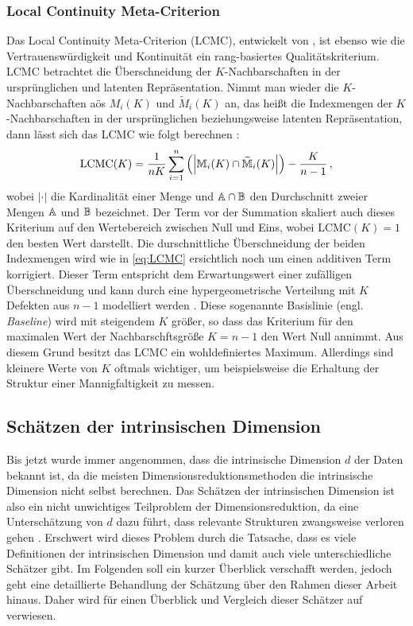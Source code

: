 \subsubsection{Local Continuity Meta-Criterion}
\label{ch:Vergleich:sec:Methodik:subsec:Qualitaetskriterien:LCMC}
Das Local Continuity Meta-Criterion (LCMC), entwickelt von \textcite{Chen.2009}, ist ebenso wie die Vertrauenswürdigkeit und Kontinuität ein rang-basiertes Qualitätskriterium. LCMC betrachtet die Überschneidung der $K$-Nachbarschaften in der ursprünglichen und latenten Repräsentation. Nimmt man wieder die $K$-Nachbarschaften aös $M_i(K)$ und $\widetilde{M}_i(K)$ an, das heißt die Indexmengen der $K$-Nachbarschaften in der ursprünglichen beziehungsweise latenten Repräsentation, dann lässt sich das LCMC wie folgt berechnen \parencite[212]{Chen.2009}:
\begin{equation}
	\label{eq:LCMC}
	\text{LCMC}(K) = \frac{1}{nK} \sum_{i=1}^{n} \left( \left| \mathbb{M}_i(K) \cap \widetilde{\mathbb{M}}_i(K) \right| \right) - \frac{K}{n - 1} \,,
\end{equation}
wobei $­|\cdot|$ die Kardinalität einer Menge und $\mathbb{A} \cap \mathbb{B}$ den Durchschnitt zweier Mengen $\mathbb{A}$ und $\mathbb{B}$ bezeichnet. Der Term vor der Summation skaliert auch dieses Kriterium auf den Wertebereich zwischen Null und Eins, wobei LCMC$(K) = 1$ den besten Wert darstellt. Die durschnittliche Überschneidung der beiden Indexmengen wird wie in \eqref{eq:LCMC} ersichtlich noch um einen additiven Term korrigiert. Dieser Term entspricht dem Erwartungswert einer zufälligen Überschneidung und kann durch eine hypergeometrische Verteilung mit $K$ Defekten aus $n - 1$ modelliert werden \parencite[213]{Chen.2009}. Diese sogenannte Basislinie (engl. \textit{Baseline}) wird mit steigendem
$K$ größer, so dass das Kriterium für den maximalen Wert der Nachbarschftsgröße $K = n - 1$ den
Wert Null annimmt. Aus diesem Grund besitzt das LCMC ein wohldefiniertes Maximum. Allerdings sind
kleinere Werte von $K$ oftmals wichtiger, um beispielsweise die Erhaltung der Struktur einer
Mannigfaltigkeit zu messen.

\subsection{Schätzen der intrinsischen Dimension}
\label{ch:Vergleich:sec:Methodik:subsec:SchaetzenDerIntrinsischenDim}

Bis jetzt wurde immer angenommen, dass die intrinsische Dimension $d$ der Daten bekannt ist, da die
meisten Dimensionsreduktionsmethoden die intrinsische Dimension nicht selbst berechnen. Das
Schätzen der intrinsischen Dimension ist also ein nicht unwichtiges Teilproblem der
Dimensionsreduktion, da eine Unterschätzung von $d$ dazu führt, dass relevante Strukturen
zwangsweise verloren gehen \parencite[1]{Levina.2004}. Erschwert wird dieses Problem durch die Tatsache, dass es viele
Definitionen der intrinsischen Dimension und damit auch viele unterschiedliche Schätzer gibt. Im
Folgenden soll ein kurzer Überblick verschafft werden, jedoch geht eine detaillierte Behandlung der
Schätzung über den Rahmen dieser Arbeit hinaus. Daher wird für einen Überblick und Vergleich dieser
Schätzer auf \textcites{Campadelli.2015}{Bac.2021}{Verveer.1995} verwiesen.

